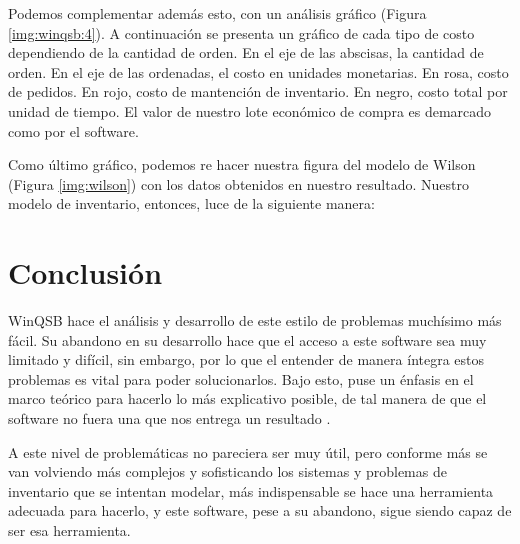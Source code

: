 Podemos complementar además esto, con un análisis gráfico (Figura \ref{img:winqsb:4}). A continuación se presenta un gráfico de cada tipo de costo dependiendo de la cantidad de orden. En el eje de las abscisas, la cantidad de orden. En el eje de las ordenadas, el costo en unidades monetarias. En rosa, costo de pedidos. En rojo, costo de mantención de inventario. En negro, costo total por unidad de tiempo. El valor de nuestro lote económico de compra es demarcado como  por el software.


Como último gráfico, podemos re hacer nuestra figura del modelo de Wilson (Figura \ref{img:wilson}) con los datos obtenidos en nuestro resultado. Nuestro modelo de inventario, entonces, luce de la siguiente manera:



\clearpage

\section{Conclusión}
WinQSB hace el análisis y desarrollo de este estilo de problemas muchísimo más fácil. Su abandono en su desarrollo hace que el acceso a este software sea muy limitado y difícil, sin embargo, por lo que el entender de manera íntegra estos problemas es vital para poder solucionarlos. Bajo esto, puse un énfasis en el marco teórico para hacerlo lo más explicativo posible, de tal manera de que el software no fuera una  que nos entrega un resultado .

A este nivel de problemáticas no pareciera ser muy útil, pero conforme más se van volviendo más complejos y sofisticando los sistemas y problemas de inventario que se intentan modelar, más indispensable se hace una herramienta adecuada para hacerlo, y este software, pese a su abandono, sigue siendo capaz de ser esa herramienta.



